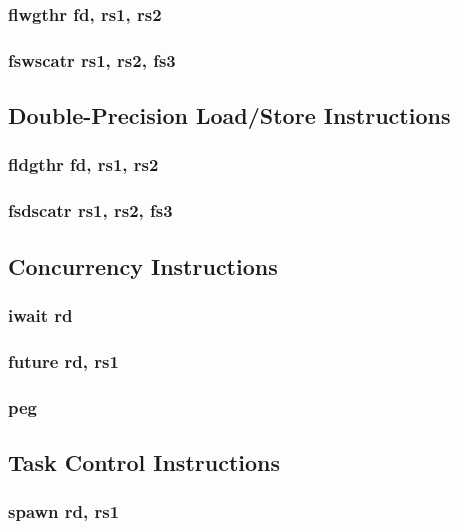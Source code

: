 \documentclass{article}
\begin{document}
\subsubsection{flwgthr fd, rs1, rs2}

\subsubsection{fswscatr rs1, rs2, fs3}

\subsection{Double-Precision Load/Store Instructions}

\subsubsection{fldgthr fd, rs1, rs2}

\subsubsection{fsdscatr rs1, rs2, fs3}

\subsection{Concurrency Instructions}
\subsubsection{iwait rd}
\subsubsection{future rd, rs1}
\subsubsection{peg}

\subsection{Task Control Instructions}
\subsubsection{spawn rd, rs1}
\end{document}
